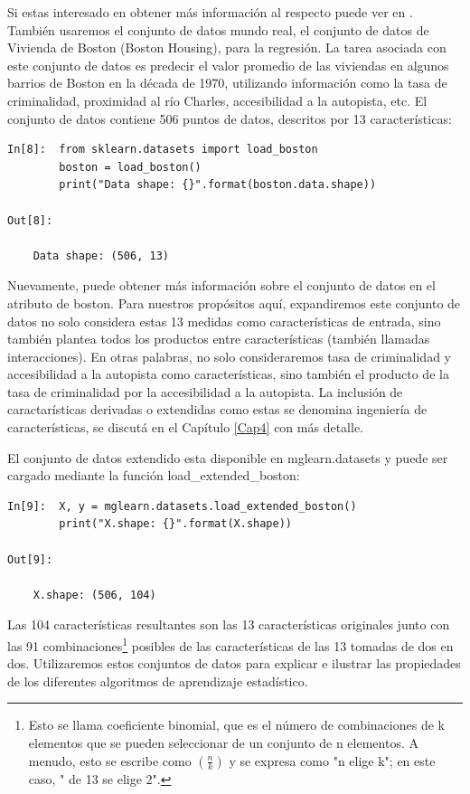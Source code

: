 {Si estas interesado en obtener más información al respecto puede ver en 
{} .\\

También usaremos el conjunto de datos mundo real, el conjunto de datos de Vivienda de Boston (Boston Housing), para la regresión.  La tarea asociada con este conjunto de datos es predecir el valor promedio de las viviendas en algunos barrios de Boston en la década de 1970, utilizando información como la tasa de criminalidad, proximidad al río Charles, accesibilidad a la autopista, etc.  El conjunto de datos contiene 506 puntos de datos, descritos por 13 características:\\

\begin{lstlisting}
In[8]:  from sklearn.datasets import load_boston
        boston = load_boston()
        print("Data shape: {}".format(boston.data.shape))

Out[8]:

    Data shape: (506, 13)
\end{lstlisting}


Nuevamente, puede obtener más información sobre el conjunto de datos en  el atributo {}
de boston. Para nuestros propósitos aquí, expandiremos este conjunto de datos no solo
considera estas 13 medidas como características de entrada, sino  también plantea  todos los productos
entre características (también llamadas interacciones). En otras palabras, no solo consideraremos
tasa de criminalidad y accesibilidad a la autopista como características, sino también el producto de la tasa de criminalidad por la accesibilidad a la autopista.  La inclusión de caractarísticas derivadas o extendidas como estas se denomina ingeniería de características, se discutá en el Capítulo \ref{Cap4} con más detalle. 

El conjunto de datos extendido esta disponible en {\ttfamily mglearn.datasets} y puede ser cargado mediante  la función {\ttfamily load\_extended\_boston}:\\

\begin{lstlisting}
In[9]:  X, y = mglearn.datasets.load_extended_boston()
        print("X.shape: {}".format(X.shape))

Out[9]:

    X.shape: (506, 104)

\end{lstlisting}

 Las 104 características resultantes son las 13 características originales junto con las 91  combinaciones\footnote {Esto se llama coeficiente binomial, que es el número de combinaciones de k elementos que se pueden seleccionar 	de un conjunto de n elementos. A menudo, esto se escribe como $(\frac{n}{k})$	y se expresa como "n elige k"; en este caso, " de 13 se  elige 2".} posibles de las características  de las 13 tomadas de dos en dos.  Utilizaremos estos conjuntos de datos para explicar e ilustrar las propiedades de los diferentes algoritmos de aprendizaje  estadístico. \\

}
